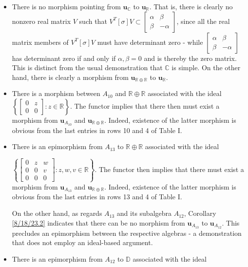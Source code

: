 \documentclass{amsart}
\numberwithin{equation}{section}
\theoremstyle{definition}
\numberwithin{theorem}{section}
\begin{document}
\begin{itemize}
\item  There is no morphism pointing from $\mathbf{u}_{\mathbb{C}}$ to $\mathbf{u}_{\mathbb{R}}$. That is, there is clearly no nonzero real matrix $V$ such that $V^T[\sigma]V \subset \left[\begin{array}{ccc}
 \alpha & \beta   \\ 
 \beta & -\alpha    
\end{array}\right]$, since all the real matrix members of $V^T[\sigma]V$  must have determinant zero - while $\left[\begin{array}{ccc}
 \alpha & \beta   \\ 
 \beta & -\alpha    
\end{array}\right]$ has determinant zero if and only if $\alpha,\beta = 0$ and is thereby the zero matrix. This is distinct from the usual demonstration that $\mathbb{C}$ is simple.  On the other hand, there is clearly a morphism from $\mathbf{u}_{\mathbb{R}\oplus\mathbb{R}}$ to $\mathbf{u}_{\mathbb{R}}$.
\item There is a morphism between $A_{10}$ and $\mathbb{R}\oplus\mathbb{R}$ associated with the ideal $\left\{\left[\begin{array}{ccc}
 0 & z   \\ 
 0 & 0    
\end{array}\right]:z\in \mathbb{R}\right\}$.  The functor implies that there then must exist a morphism from $\mathbf{u}_{A_{10}}$ and $\mathbf{u}_{\mathbb{R}\oplus\mathbb{R}}$.  Indeed, existence of the latter morphism is obvious from the last entries in rows 10 and 4 of Table I. 
\item There is an epimorphism from $A_{13}$ to $\mathbb{R}\oplus\mathbb{R}$ associated with the ideal

 $\left\{\left[\begin{array}{ccc}
0  & z & w   \\
 0 & 0 & v \\
 0 & 0 & 0    
\end{array}\right]:z,w,v\in\mathbb{R}\right\}$. The functor then implies that there must exist a morphism from $\mathbf{u}_{A_{13}}$ and $\mathbf{u}_{\mathbb{R}\oplus\mathbb{R}}$.  Indeed, existence of the latter morphism is obvious from the last entries in rows 13 and 4 of Table I.  

On the other hand, as regards $A_{13}$ and its subalgebra $A_{12}$, Corollary \ref{8/18/23.2} indicates that there can be no morphism from $\mathbf{u}_{A_{13}}$ to $\mathbf{u}_{A_{12}}$.  This precludes an epimorphism between the respective algebras - a demonstration that does not employ an ideal-based argument.
\item 
There is an epimorphism from $A_{12}$ to  $\mathbb{D}$ associated with the ideal


\end{itemize}
\end{document}

